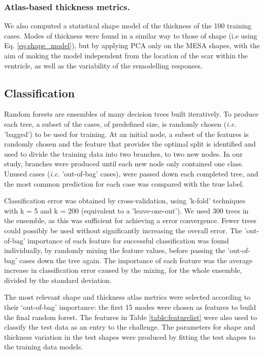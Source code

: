 \documentclass{llncs}
\begin{document}
\subsubsection{Atlas-based thickness metrics.} 

We also computed a statistical shape model of the thickness of the 100 training cases. Modes of thickness were found in a similar way to those of shape (i.e using Eq. \ref{eq:shape_model}), but by applying PCA only on the MESA shapes, with the aim of making the model independent from the location of the scar within the ventricle, as well as the variability of the remodelling responses.

	
	\subsection{Classification}

\label{method:classification}

 

Random forests are ensembles of many decision trees built iteratively. To produce each tree, a subset of the cases, of predefined size, is randomly chosen (\emph{i.e.} 'bagged') to be used for training. At an initial node, a subset of the features is randomly chosen and the feature that provides the optimal split is identified and used to divide the training data into two branches, to two new nodes. In our study, branches were produced until each new node only contained one class. Unused cases (\emph{i.e.} 'out-of-bag' cases), were passed down each completed tree, and the most common prediction for each case was compared with the true label.

Classification error was obtained by cross-validation, using 'k-fold' techniques with k = 5 and k = 200 (equivalent to a 'leave-one-out'). We used 300 trees in the ensemble, as this was sufficient for achieving a error convergence. Fewer trees could possibly be used without significantly increasing the overall error. The 'out-of-bag' importance of each feature for successful classification was found individually, by randomly mixing the feature values, before passing the 'out-of-bag' cases down the tree again. The importance of each feature was the average increase in classification error caused by the mixing, for the whole ensemble, divided by the standard deviation.

The most relevant shape and thickness atlas metrics were selected according to their ‘out-of-bag’ importance: the first 15 modes were chosen as features to build the final random forest. The features in Table \ref{table:featurelist} were also used to classify the test data as an entry to the challenge. The parameters for shape and thickness variation in the test shapes were produced by fitting the test shapes to the training data models.
\end{document}
